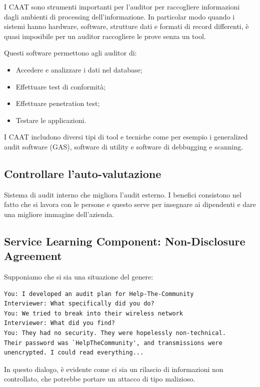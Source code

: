 I CAAT sono strumenti importanti per l'auditor per raccogliere
informazioni dagli ambienti di processing dell'informazione.
In particolar modo quando i sistemi hanno hardware, software, strutture
dati e formati di record differenti, è quasi imposibile per un auditor
raccogliere le prove senza un tool.

Questi software permettono agli auditor di:
\begin{itemize}
\item Accedere e analizzare i dati nel database;
\item Effettuare test di conformità;
\item Effettuare penetration test;
\item Testare le applicazioni.
\end{itemize}

I CAAT includono diversi tipi di tool e tecniche come per esempio
i generalized audit software (GAS), software di utility e
software di debbugging e scanning.



\subsection{Controllare l'auto-valutazione}

Sistema di audit interno che migliora l'audit esterno. I benefici consistono
nel fatto che si lavora con le persone e questo serve per insegnare ai
dipendenti e dare una migliore immagine dell'azienda.


\subsection{Service Learning Component: Non-Disclosure Agreement}

Supponiamo che si sia una situazione del genere:

\begin{verbatim}
You: I developed an audit plan for Help-The-Community
Interviewer: What specifically did you do?
You: We tried to break into their wireless network
Interviewer: What did you find?
You: They had no security. They were hopelessly non-technical.
Their password was `HelpTheCommunity', and transmissions were
unencrypted. I could read everything...
\end{verbatim}

In questo dialogo, è evidente come ci sia un rilascio di informazioni non
controllato, che potrebbe portare un attacco di tipo malizioso.

